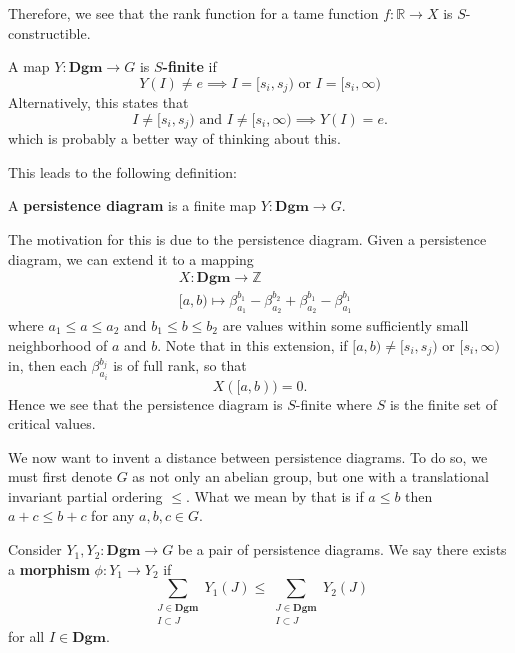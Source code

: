 \textcolor{NavyBlue}{Therefore, we see that the rank function 
for a tame function $f: \mathbb{R} \to X$ is $S$-constructible.}

\begin{definition}
    A map $Y: \textbf{Dgm} \to G$ is \textbf{$S$-finite} if 
    \[
        Y(I) \ne e \implies I = [s_i, s_j) \text{ or } I = [s_i, \infty)
    \]
    Alternatively, this states that 
    \[
        I \ne [s_i, s_j) \text{ and } I \ne [s_i, \infty) \implies Y(I) = e.
    \]
    which is probably a better way of thinking about this. 
\end{definition}

This leads to the following definition: 
\begin{definition}
    A \textbf{persistence diagram} is a finite map $Y: \textbf{Dgm} \to G$. 
\end{definition}

The motivation for this is due to the persistence diagram. Given a persistence diagram, 
we can extend it to a mapping 
\begin{align*}
    &X: \textbf{Dgm} \to \mathbb{Z}\\
    &[a, b) \mapsto \beta_{a_1}^{b_1} - \beta_{a_2}^{b_2} + \beta_{a_2}^{b_1} - \beta_{a_1}^{b_1}
\end{align*}
where $a_1 \le a \le a_2$ and $b_1 \le b \le b_2$ are values within some sufficiently 
small neighborhood of $a$ and $b$. Note that in this extension, if $[a, b) \ne [s_i, s_j)$ 
or $[s_i, \infty )$ in, then each $\beta_{a_i}^{b_j}$ is of full rank, so that 
\[
    X([a, b)) = 0.
\]
Hence we see that the persistence diagram is $S$-finite where $S$ is the finite set of
critical values. 

We now want to invent a distance between persistence diagrams. To do so, we must 
first denote $G$ as not only an abelian group, but one with a 
translational invariant partial ordering $\le$. What we mean by that is if 
$a \le b$ then $a + c \le b + c$ for any $a, b ,c \in G$. 

\begin{definition}
    Consider $Y_1, Y_2: \textbf{Dgm} \to G$ be a pair of persistence diagrams. 
    We say there exists a \textbf{morphism} $\phi: Y_1 \to Y_2$ if 
    \[
        \sum_{\substack{J \in \textbf{Dgm} \\ I \subset J}}Y_1(J) \le \sum_{\substack{J \in \textbf{Dgm} \\ I \subset J}}Y_2(J)
    \]
    for all $I \in \textbf{Dgm}$. 
\end{definition}

